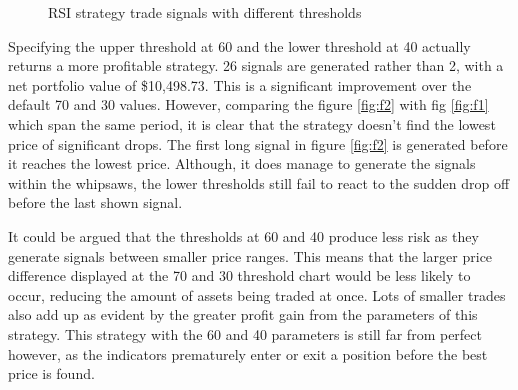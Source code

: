 \begin{figure}[ht]
  \centering
  \hfill
  \caption{RSI strategy trade signals with different thresholds}
  \label{fig:eval:strats:rsi_signals}
\end{figure}

Specifying the upper threshold at 60 and the lower threshold at 40 actually returns a more profitable strategy. 26 signals are generated rather than 2, with a net portfolio value of \$10,498.73. This is a significant improvement over the default 70 and 30 values. However, comparing the figure \ref{fig:f2} with fig \ref{fig:f1} which span the same period, it is clear that the strategy doesn't find the lowest price of significant drops. The first long signal in figure \ref{fig:f2} is generated before it reaches the lowest price. Although, it does manage to generate the signals within the whipsaws, the lower thresholds still fail to react to the sudden drop off before the last shown signal.

It could be argued that the thresholds at 60 and 40 produce less risk as they generate signals between smaller price ranges. This means that the larger price difference displayed at the 70 and 30 threshold chart would be less likely to occur, reducing the amount of assets being traded at once. Lots of smaller trades also add up as evident by the greater profit gain from the parameters of this strategy. This strategy with the 60 and 40 parameters is still far from perfect however, as the indicators prematurely enter or exit a position before the best price is found.

